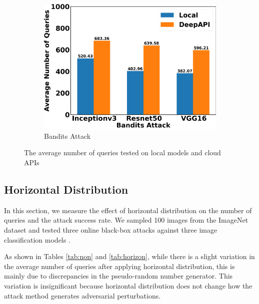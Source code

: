 \begin{figure}[bth]
\begin{subfigure}[b]{0.31\textwidth}
    \includegraphics[width=\textwidth]{figures/chapter_classification/bandits_number_of_queries.png}
    \caption{Bandits Attack}
    \label{fig:bandits_queries}
\end{subfigure}
\caption{The average number of queries tested on local models and cloud APIs}
\label{fig.queries}
\end{figure}


\subsection{Horizontal Distribution}

In this section, we measure the effect of horizontal distribution on the number of queries and the attack success rate. We sampled 100 images from the ImageNet dataset \cite{moore2020fiftyone} and tested three online black-box attacks against three image classification models \cite{chollet2015keras}.

As shown in Tables \ref{tab:non} and \ref{tab:horizon}, while there is a slight variation in the average number of queries after applying horizontal distribution, this is mainly due to discrepancies in the pseudo-random number generator. This variation is insignificant because horizontal distribution does not change how the attack method generates adversarial perturbations.

